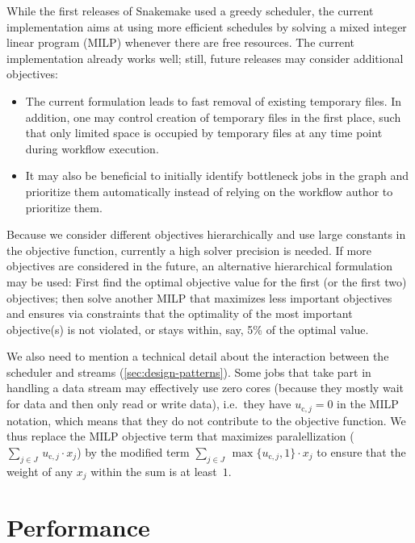 \documentclass[10pt,a4paper,twocolumn]{article}
\begin{document}
While the first releases of Snakemake used a greedy scheduler, the current implementation aims at using more efficient schedules by solving a mixed integer linear program (MILP) whenever there are free resources.
The current implementation already works well; still, future releases may consider additional objectives:
\begin{itemize}
\item The current formulation leads to fast removal of existing temporary files. In addition, one may control creation of temporary files in the first place, such that only limited space is occupied by temporary files at any time point during workflow execution.
\item It may also be beneficial to initially identify bottleneck jobs in the graph and prioritize them automatically instead of relying on the workflow author to prioritize them.
\end{itemize}
Because we consider different objectives hierarchically and use large constants in the objective function, currently a high solver precision is needed.
If more objectives are considered in the future, an alternative hierarchical formulation may be used:
First find the optimal objective value for the first (or the first two) objectives; then solve another MILP that maximizes less important objectives and ensures via constraints that the optimality of the most important objective(s) is not violated, or stays within, say, 5\% of the optimal value.

\newcommand{\cores}{\text{c}}

We also need to mention a technical detail about the interaction between the scheduler and streams (\autoref{sec:design-patterns}).
Some jobs that take part in handling a data stream may effectively use zero cores (because they mostly wait for data and then only read or write data), i.e.\ they have $u_{\cores,j} = 0$ in the MILP notation, which means that they do not contribute to the objective function. 
We thus replace the MILP objective term that maximizes paralellization ($\sum_{j\in J}\, u_{\cores,j} \cdot x_j$) by the modified term $\sum_{j\in J}\, \max \{ u_{\cores,j}, 1\} \cdot x_j$ to ensure that the weight of any $x_j$ within the sum is at least~$1$.

\section{Performance}\label{sec:performance}
\end{document}
